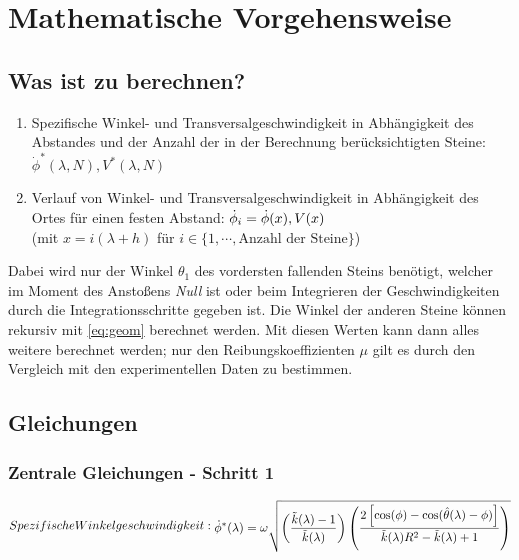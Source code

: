 \section*{Mathematische Vorgehensweise \label{MathVorg}}

\setcounter{equation}{0}
\renewcommand{\theequation}{\Roman{equation}}

\subsection{Was ist zu berechnen?}
\begin{enumerate}
    \item Spezifische Winkel- und Transversalgeschwindigkeit in Abhängigkeit
        des Abstandes und der Anzahl der in der Berechnung berücksichtigten
        Steine:
        $\dot{\phi}^*(\lambda, N), V^*(\lambda, N)$
    \item Verlauf von Winkel- und Transversalgeschwindigkeit in Abhängigkeit
        des Ortes für einen festen Abstand:
        $\dot{\phi}_i = \dot{\phi}(x), V(x)$\\
        (mit $x = i(\lambda + h)$ für $i \in \{1, \cdots, \text{Anzahl
        der Steine}\}$)
\end{enumerate}
Dabei wird nur der Winkel $\theta_1$ des vordersten fallenden Steins benötigt,
welcher im Moment des Anstoßens \textit{Null} ist oder beim Integrieren der
Geschwindigkeiten durch die Integrationsschritte gegeben ist. Die Winkel der
anderen Steine können rekursiv mit \eqref{eq:geom} berechnet werden. Mit
diesen Werten kann dann alles weitere berechnet werden; nur den
Reibungskoeffizienten $\mu$ gilt es durch den Vergleich mit den experimentellen
Daten zu bestimmen.

\subsection{Gleichungen}
\subsubsection{Zentrale Gleichungen - Schritt 1}
\begin{subequations}
    Spezifische Winkelgeschwindigkeit:
    \begin{align}
    \phistar = \omega \sqrt{\left(
        \frac{\kl-1}{\kl} \right) \left( \frac{2\left[
    \cos(\phi)-\cos(\hat{\theta}(\lambda)-\phi)\right]}{\kl R^2 -\kl+1} \right)}
    \end{align}
\end{subequations}

